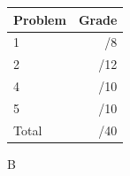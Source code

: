 \documentclass[12pt]{article}
\newcommand{\skipline}{\vspace{12pt}}
\begin{document}
\begin{table}[hbt]
\begin{center}
\begin{tabular}{|l|r|} \hline
Problem &Grade\\
\hline \hline
\cline{1-2} 1 & \enspace\enspace\enspace\enspace\enspace\enspace/8\\
\cline{1-2} 2 & \enspace\enspace\enspace\enspace\enspace\enspace/12\\
\cline{1-2} 4 & \enspace\enspace\enspace\enspace\enspace\enspace/10\\
\cline{1-2} 5 & \enspace\enspace\enspace\enspace\enspace\enspace/10\\
\cline{1-2} Total & \enspace\enspace\enspace\enspace\enspace\enspace/40\\
\hline
\end{tabular}

\skipline

\skipline

\skipline

B
\end{center}
\end{table}
\newpage
\end{document}
